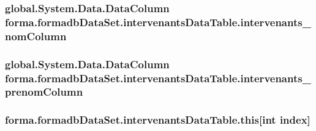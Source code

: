\subsubsection[{\texorpdfstring{intervenants\+\_\+nom\+Column}{intervenants_nomColumn}}]{\setlength{\rightskip}{0pt plus 5cm}global.\+System.\+Data.\+Data\+Column forma.\+formadb\+Data\+Set.\+intervenants\+Data\+Table.\+intervenants\+\_\+nom\+Column\hspace{0.3cm}{\ttfamily [get]}}\hypertarget{classforma_1_1formadb_data_set_1_1intervenants_data_table_a6c94b1e95092fadde1d8ae53067e033c}{}\label{classforma_1_1formadb_data_set_1_1intervenants_data_table_a6c94b1e95092fadde1d8ae53067e033c}
\subsubsection[{\texorpdfstring{intervenants\+\_\+prenom\+Column}{intervenants_prenomColumn}}]{\setlength{\rightskip}{0pt plus 5cm}global.\+System.\+Data.\+Data\+Column forma.\+formadb\+Data\+Set.\+intervenants\+Data\+Table.\+intervenants\+\_\+prenom\+Column\hspace{0.3cm}{\ttfamily [get]}}\hypertarget{classforma_1_1formadb_data_set_1_1intervenants_data_table_af1902cb5af200c91ae0e7ddd42d4162e}{}\label{classforma_1_1formadb_data_set_1_1intervenants_data_table_af1902cb5af200c91ae0e7ddd42d4162e}
\subsubsection[{\texorpdfstring{this[int index]}{this[int index]}}]{ forma.\+formadb\+Data\+Set.\+intervenants\+Data\+Table.\+this\mbox{[}int index\mbox{]}\hspace{0.3cm}{\ttfamily [get]}}\hypertarget{classforma_1_1formadb_data_set_1_1intervenants_data_table_a4200399b3a0b27bbcc052a888028aa92}{}\label{classforma_1_1formadb_data_set_1_1intervenants_data_table_a4200399b3a0b27bbcc052a888028aa92}


